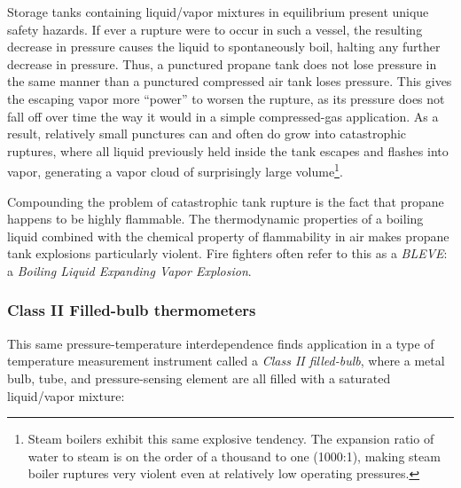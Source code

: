 \vskip 10pt

Storage tanks containing liquid/vapor mixtures in equilibrium present unique safety hazards.  If ever a rupture were to occur in such a vessel, the resulting decrease in pressure causes the liquid to spontaneously boil, halting any further decrease in pressure.  Thus, a punctured propane tank does not lose pressure in the same manner than a punctured compressed air tank loses pressure.  This gives the escaping vapor more ``power'' to worsen the rupture, as its pressure does not fall off over time the way it would in a simple compressed-gas application.  As a result, relatively small punctures can and often do grow into catastrophic ruptures, where all liquid previously held inside the tank escapes and flashes into vapor, generating a vapor cloud of surprisingly large volume\footnote{Steam boilers exhibit this same explosive tendency.  The expansion ratio of water to steam is on the order of a thousand to one (1000:1), making steam boiler ruptures very violent even at relatively low operating pressures.}.  

Compounding the problem of catastrophic tank rupture is the fact that propane happens to be highly flammable.  The thermodynamic properties of a boiling liquid combined with the chemical property of flammability in air makes propane tank explosions particularly violent.  Fire fighters often refer to this as a \textit{BLEVE}: a \textit{Boiling Liquid Expanding Vapor Explosion}.    





\filbreak
\subsubsection{Class II Filled-bulb thermometers}

This same pressure-temperature interdependence finds application in a type of temperature measurement instrument called a \textit{Class II filled-bulb}, where a metal bulb, tube, and pressure-sensing element are all filled with a saturated liquid/vapor mixture:  

